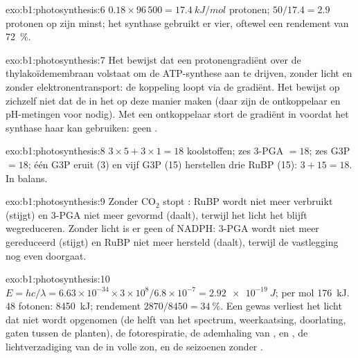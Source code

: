 \begin{solution}{exo:b1:photosynthesis:6}
$0.18\times 96\,500 = \qty{17.4}{kJ/mol}$ protonen; $50/17.4 = 2.9$ protonen op
zijn minst; het synthase gebruikt er vier, oftewel een rendement van \qty{72}{\%}.
\end{solution}

\begin{solution}{exo:b1:photosynthesis:7}
Het bewijst dat een protonengradiënt over de thylakoïdemembraan volstaat om de
ATP-synthese aan te drijven, zonder licht en zonder elektronentransport: de
koppeling loopt via de gradiënt. Het bewijst op zichzelf niet dat de 
in het  op deze manier  maken (daar zijn de ontkoppelaar en pH-metingen voor
nodig). Met een ontkoppelaar stort de gradiënt in voordat het synthase haar kan
gebruiken: geen .
\end{solution}

\begin{solution}{exo:b1:photosynthesis:8}
$3\times 5 + 3\times 1 = 18$ koolstoffen; zes 3-PGA $= 18$; zes G3P $= 18$; één
G3P eruit (3) en vijf G3P (15) herstellen drie RuBP (15): $3 +
15 = 18$. In balans.
\end{solution}

\begin{solution}{exo:b1:photosynthesis:9}
Zonder $\mathrm{CO_2}$ stopt : RuBP wordt niet meer verbruikt (stijgt) en
3-PGA niet meer gevormd (daalt), terwijl het licht het blijft wegreduceren. Zonder
licht is er geen  of NADPH: 3-PGA wordt niet meer gereduceerd (stijgt) en RuBP
niet meer hersteld (daalt), terwijl de vastlegging nog even doorgaat.
\end{solution}

\begin{solution}{exo:b1:photosynthesis:10}
$E = hc/\lambda = 6.63\times 10^{-34}\times 3\times 10^8/6.8\times
10^{-7} = \qty{2.92e-19}{J}$; per mol \qty{176}{kJ}. 48 fotonen: \qty{8450}{kJ};
rendement $2870/8450 = \qty{34}{\%}$. Een gewas verliest het licht dat niet wordt
opgenomen (de helft van het spectrum, weerkaatsing, doorlating, gaten tussen de
planten), de fotorespiratie, de ademhaling van ,  en , de
lichtverzadiging van de  in volle zon, en de seizoenen zonder .
\end{solution}

